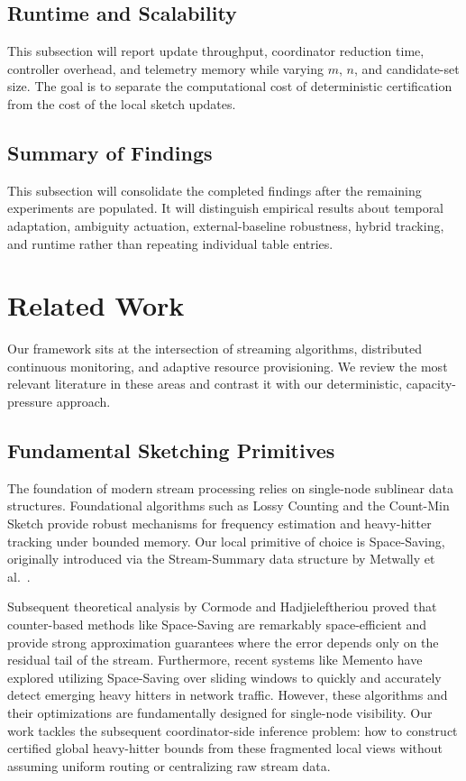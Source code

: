 \documentclass[sigconf, nonacm]{acmart}
\begin{document}
\subsection{Runtime and Scalability}
\label{subsec:exp-runtime}
This subsection will report update throughput, coordinator reduction time, controller overhead, and telemetry memory while varying \(m\), \(n\), and candidate-set size. The goal is to separate the computational cost of deterministic certification from the cost of the local sketch updates.

\subsection{Summary of Findings}
This subsection will consolidate the completed findings after the remaining experiments are populated. It will distinguish empirical results about temporal adaptation, ambiguity actuation, external-baseline robustness, hybrid tracking, and runtime rather than repeating individual table entries.

\section{Related Work}
\label{sec:related}

Our framework sits at the intersection of streaming algorithms, distributed continuous monitoring, and adaptive resource provisioning. We review the most relevant literature in these areas and contrast it with our deterministic, capacity-pressure approach.

\subsection{Fundamental Sketching Primitives}
The foundation of modern stream processing relies on single-node sublinear data structures. Foundational algorithms such as Lossy Counting \cite{manku2002approximate} and the Count-Min Sketch \cite{cormode2005improved} provide robust mechanisms for frequency estimation and heavy-hitter tracking under bounded memory. Our local primitive of choice is Space-Saving, originally introduced via the Stream-Summary data structure by Metwally et al.~\cite{metwally2005efficient}. 

Subsequent theoretical analysis by Cormode and Hadjieleftheriou \cite{cormode2010space} proved that counter-based methods like Space-Saving are remarkably space-efficient and provide strong approximation guarantees where the error depends only on the residual tail of the stream. Furthermore, recent systems like Memento \cite{belhassen2018memento} have explored utilizing Space-Saving over sliding windows to quickly and accurately detect emerging heavy hitters in network traffic. However, these algorithms and their optimizations are fundamentally designed for single-node visibility. Our work tackles the subsequent coordinator-side inference problem: how to construct certified global heavy-hitter bounds from these fragmented local views without assuming uniform routing or centralizing raw stream data.
\end{document}
